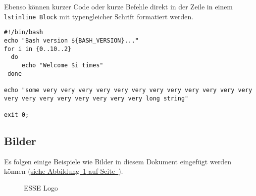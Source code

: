\documentclass[12pt,a4paper,titlepage,oneside]{scrartcl}
\begin{document}
Ebenso können kurzer Code oder kurze Befehle direkt in der Zeile in einem \lstinline{lstinline Block} mit typengleicher Schrift formatiert werden.



\begin{lstlisting}[caption=Example bash script,label=code:beispiel2,style=simple]
#!/bin/bash
echo "Bash version ${BASH_VERSION}..."
for i in {0..10..2}
  do
     echo "Welcome $i times"
 done

echo "some very very very very very very very very very very very very very very very very very very very very long string"

exit 0;
\end{lstlisting}

\subsection{Bilder}

Es folgen einige Beispiele wie Bilder in diesem Dokument eingefügt werden können
(\hyperref[fig:logo1]{siehe Abbildung~\ref*{fig:logo1} auf Seite~\pageref*{fig:logo1}}).

\begin{figure}[h!]
  \centering
  \caption{ESSE Logo}
  \label{fig:logo1}
\end{figure}


%
%
\end{document}
